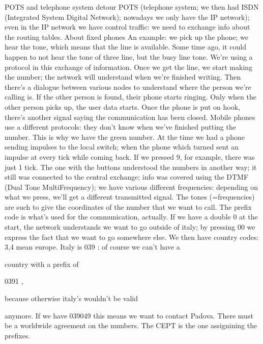 {{{{{POTS and telephone system detour POTS (telephone system; we then had ISDN (Integrated System Digital Network);
nowadays we only have the IP network); even in the IP network we have control traffic:
we need to exchange info about the routing tables.
About fixed phones An example: we pick up the phone; we hear the tone, which means that the line is available. Some time ago, it could happen to not hear the tone of three line, but the busy line tone. We're using a protocol in this exchange of information. Once we get the line, we start making the number; the network will understand when we're finished writing. Then there's a dialogue between various nodes to understand where the person we're calling is.
If the other person is found, their phone starts ringing. Only when the other person picks up, the user data starts. Once the phone is put on hook, there's another signal saying the communication has been closed.
Mobile phones use a different protocols: they don't know when we've finished putting the number. This is why we have the green number.
At the time we had a phone sending impulses to the local switch; when the phone which turned sent an impulse at every tick while coming back. If we pressed 9,
for example, there was just 1 tick.
The one with the buttons understood the numbers in another way; it still was connected to the central exchange; info was covered using the DTMF (Dual Tone MultiFrequency); we have various different frequencies: depending on what we press, we'll get a different transmitted signal. The tones (=frequencies) are such to give the coordinates of the number that we want to call.
The prefix code is what's used for the communication, actually. If we have a double 0 at the start, the network understands we want to go outside of italy; by pressing 00 we express the fact that we want to go somewhere else. We then have country codes: 3,4 mean europe. Italy is 039 : of course we can't have a

country with a prefix of

0391 ,

because otherwise italy's wouldn't be valid

anymore.
If we have 039049 this means we want to contact Padova.
There must be a worldwide agreement on the numbers. The CEPT is the one assignining the prefixes.

}}}}}
